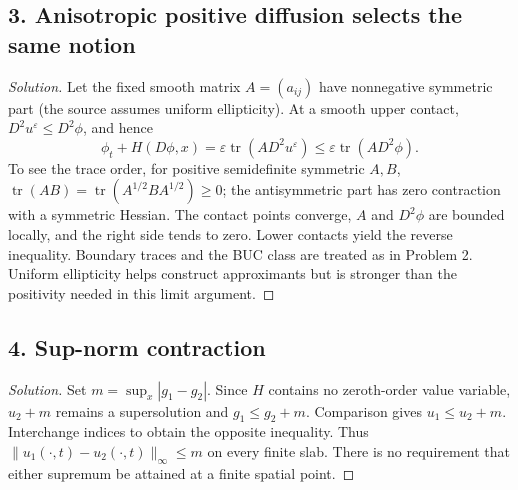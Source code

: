 \subsection*{3. Anisotropic positive diffusion selects the same notion}
\begin{proof}[Solution]
Let the fixed smooth matrix $A=(a_{ij})$ have nonnegative symmetric part
(the source assumes uniform ellipticity). At a smooth upper contact,
$D^2u^\varepsilon\leq D^2\phi$, and hence
\[
 \phi_t+H(D\phi,x)
 =\varepsilon\operatorname{tr}(A D^2u^\varepsilon)
 \leq\varepsilon\operatorname{tr}(A D^2\phi).
\]
To see the trace order, for positive semidefinite symmetric $A,B$,
$\operatorname{tr}(AB)=\operatorname{tr}(A^{1/2}BA^{1/2})\geq0$;
the antisymmetric part has zero contraction with a symmetric Hessian.
The contact points converge, $A$ and $D^2\phi$ are bounded locally,
and the right side tends to zero. Lower contacts yield the reverse
inequality. Boundary traces and the BUC class are treated as in Problem 2.
Uniform ellipticity helps construct approximants but is stronger than
the positivity needed in this limit argument.
\end{proof}

\subsection*{4. Sup-norm contraction}
\begin{proof}[Solution]
Set $m=\sup_x|g_1-g_2|$. Since $H$ contains no zeroth-order value
variable, $u_2+m$ remains a supersolution and $g_1\leq g_2+m$.
Comparison gives $u_1\leq u_2+m$. Interchange indices to obtain the
opposite inequality. Thus $\|u_1(\cdot,t)-u_2(\cdot,t)\|_\infty\leq m$
on every finite slab. There is no requirement that either supremum
be attained at a finite spatial point.
\end{proof}

